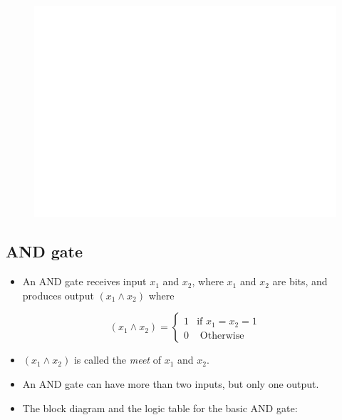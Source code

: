 \documentclass[]{book}
\providecommand{\tightlist}{%
  \setlength{\itemsep}{0pt}\setlength{\parskip}{0pt}}
\begin{document}
\begin{figure}

{\centering \includegraphics[width=1\linewidth]{figure/boxC41-1} 

}

\end{figure}

\hypertarget{and-gate}{%
\subsection{AND gate}\label{and-gate}}

\begin{itemize}
\tightlist
\item
  An AND gate receives input \(x_1\) and \(x_2\), where \(x_1\) and \(x_2\) are bits, and produces output \((x_1 \land x_2)\) where
\end{itemize}

\begin{equation}
(x_1 \land x_2) =
\begin{cases} 
1 & \text{if } x_1=x_2=1\\
0 & \text{ Otherwise }
\end{cases}
\end{equation}

\begin{itemize}
\tightlist
\item
  \((x_1 \land x_2)\) is called the \emph{meet} of \(x_1\) and \(x_2\).
\item
  An AND gate can have more than two inputs, but only one output.
\item
  The block diagram and the logic table for the basic AND gate:
\end{itemize}
\end{document}
